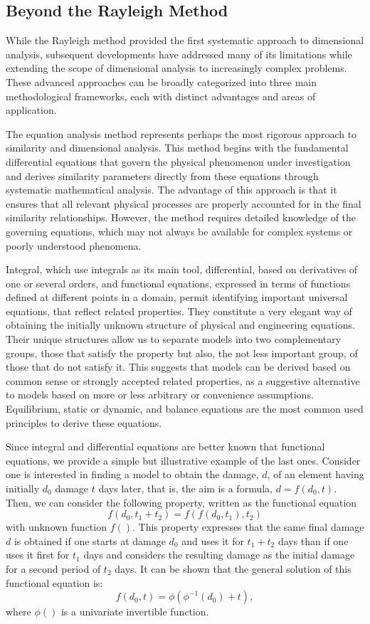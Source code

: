 \documentclass[
	11pt, %
	fleqn, %
	a4paper, %
]{LegrandOrangeBook}
\begin{document}
\subsection{Beyond the Rayleigh Method}

While the Rayleigh method provided the first systematic approach to dimensional analysis, subsequent developments have addressed many of its limitations while extending the scope of dimensional analysis to increasingly complex problems. These advanced approaches can be broadly categorized into three main methodological frameworks, each with distinct advantages and areas of application.

The equation analysis method represents perhaps the most rigorous approach to similarity and dimensional analysis. This method begins with the fundamental differential equations that govern the physical phenomenon under investigation and derives similarity parameters directly from these equations through systematic mathematical analysis. The advantage of this approach is that it ensures that all relevant physical processes are properly accounted for in the final similarity relationships. However, the method requires detailed knowledge of the governing equations, which may not always be available for complex systems or poorly understood phenomena.

Integral, which use integrals as its main tool, differential, based on derivatives of one or several orders, and functional equations, expressed in terms of functions defined at different points in a domain, permit identifying important universal equations, that reflect related properties. They constitute a very elegant way of obtaining the initially unknown structure of physical and engineering equations. Their unique structures  allow us to separate models into two complementary groups, those that satisfy the property but also, the not less important group, of those that do not satisfy it. This suggests that models can be derived based on common sense or strongly accepted related properties, as a suggestive alternative to models based on more or less arbitrary or convenience assumptions. Equilibrium, static or dynamic, and balance equations are the most common used principles to derive these equations.

Since integral and differential equations are better known that functional equations, we provide a simple but illustrative example of the last ones. Consider one is interested in finding a model to obtain the damage, $d$, of an element having initially $d_0$ damage $t$ days later, that is, the aim is a formula, $d=f(d_0,t)$. Then, we can consider the following property, written as the functional equation
$$
f(d_0, t_1+t_2)=f(f(d_0, t_1), t_2)
$$
with unknown function $f()$. This property expresses that the same final damage $d$ is obtained if one starts at damage $d_0$ and uses it for $t_1+t_2$ days than if one uses it first for $t_1$ days and considers the resulting damage as the initial damage for a second period of $t_2$ days.  It can be shown that the general solution of this functional equation is:
$$
f(d_0, t) = \phi(\phi^{-1}(d_0)+t),
$$
where $\phi()$ is a univariate invertible function.
\end{document}
